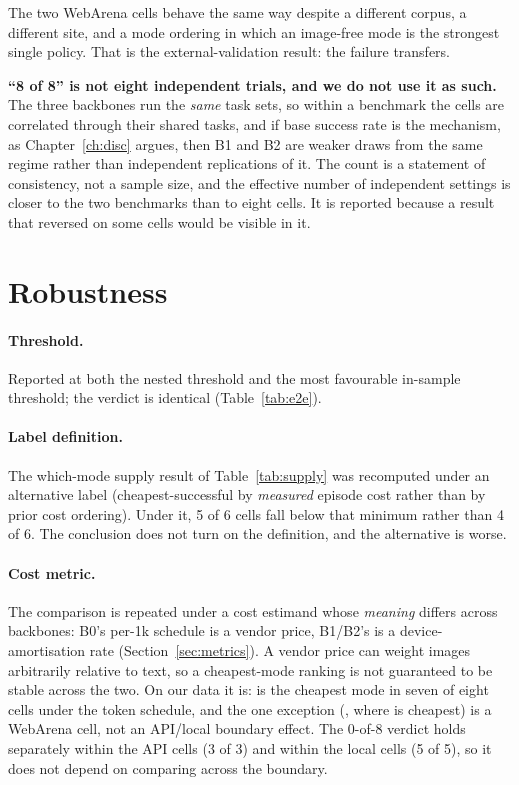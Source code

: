 The two WebArena cells behave the same way despite a different corpus, a
different site, and a mode ordering in which an image-free mode is the strongest
single policy. That is the external-validation result: the failure transfers.

\begin{scopebox}
\textbf{``8 of 8'' is not eight independent trials, and we do not use it as
such.} The three backbones run the \emph{same} task sets, so within a benchmark
the cells are correlated through their shared tasks, and if base success rate is the mechanism, as Chapter~\ref{ch:disc} argues, then B1 and B2 are weaker
draws from the same regime rather than independent replications of it. The count
is a statement of consistency, not a sample size, and the effective number of
independent settings is closer to the two benchmarks than to eight cells. It is
reported because a result that reversed on some cells would be visible in it.
\end{scopebox}

\FloatBarrier
\section{Robustness}
\label{sec:robustness}

\paragraph{Threshold.} Reported at both the nested threshold and the most
favourable in-sample threshold; the verdict is identical
(Table~\ref{tab:e2e}).

\paragraph{Label definition.} The which-mode supply result of
Table~\ref{tab:supply} was recomputed under an alternative label
(cheapest-successful by \emph{measured} episode cost rather than by prior cost
ordering). Under it, 5 of 6 cells fall below that minimum rather than 4 of 6. The conclusion does not turn on the definition, and the alternative is worse.

\paragraph{Cost metric.} The comparison is repeated under a cost estimand whose
\emph{meaning} differs across backbones: B0's per-1k schedule is a vendor price,
B1/B2's is a device-amortisation rate (Section~\ref{sec:metrics}). A vendor
price can weight images arbitrarily relative to text, so a cheapest-mode ranking
is not guaranteed to be stable across the two. On our data it is: \mVis{} is the
cheapest mode in seven of eight cells under the token schedule, and the one
exception (, where \mDOM{} is cheapest) is a WebArena
cell, not an API/local boundary effect. The 0-of-8 verdict holds separately
within the API cells (3 of 3) and within the local cells (5 of 5), so it does not
depend on comparing across the boundary.

